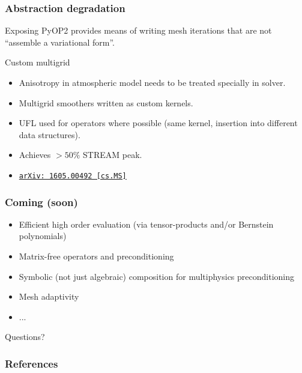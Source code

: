 \documentclass[presentation]{beamer}
\newcommand{\arxivlink}[2]{%
  \href{http://www.arxiv.org/abs/#1}%
  {{\small\texttt{arXiv:\,#1\,[#2]}}}%
}
\begin{document}
\begin{frame}
  \frametitle{Abstraction degradation}
  Exposing PyOP2 provides means of writing mesh iterations that are
  not ``assemble a variational form''.

  \begin{exampleblock}{Custom multigrid}
    \begin{itemize}
    \item Anisotropy in atmospheric model needs to be treated
      specially in solver.
    \item Multigrid smoothers written as custom kernels.
    \item UFL used for operators where possible (same kernel, insertion
      into different data structures).
    \item Achieves $> 50\%$ STREAM peak.
    \item \cite{Mitchell:2016} \arxivlink{1605.00492}{cs.MS}
    \end{itemize}
  \end{exampleblock}
\end{frame}

\begin{frame}
  \frametitle{Coming (soon)}
  \begin{itemize}
  \item Efficient high order evaluation (via tensor-products and/or
    Bernstein polynomials)
  \item Matrix-free operators and preconditioning
  \item Symbolic (not just algebraic) composition for multiphysics
    preconditioning
  \item Mesh adaptivity
  \item ...
  \end{itemize}
\end{frame}

\begin{frame}[standout]
  Questions?
\end{frame}

\appendix
\begin{frame}[allowframebreaks]
  \frametitle{References}
  \printbibliography[heading=none]
\end{frame}
\end{document}

